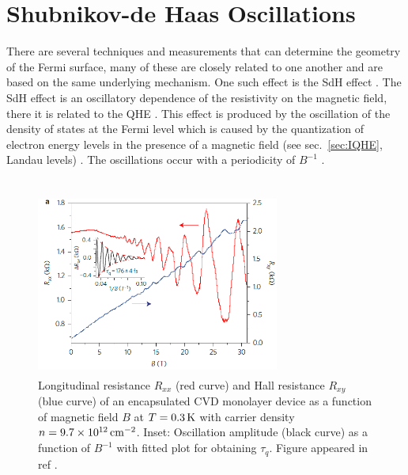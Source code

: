\section{Shubnikov-de Haas Oscillations}\label{sec:qm_oscillations}
There are several techniques and measurements that can determine the geometry of the Fermi surface, many of these are closely related to one another and are based on the same underlying mechanism. One such effect is the \acs{SdH} effect \cite{Shubnikov_Leiden1930}. The \acs{SdH} effect is an oscillatory dependence of the resistivity on the magnetic field, there it is related to the \ac{QHE} \cite{Soule_PhysRev1964}. This effect is produced by the oscillation of the density of states at the Fermi level which is caused by the quantization of electron energy levels in the presence of a magnetic field (see sec.~\ref{sec:IQHE}, Landau levels) \cite{Peierls_ZPhys1933,Landau_RoyalSoc1939}. The oscillations occur with a periodicity of $B^{-1}$ \cite{Shoenberg_Magnet1984}.\\ \\
\begin{figure}[ht]
	\centering
	\includegraphics[height=6cm,width=8cm]{figs/future/mos2_SdH_oscillations}
	\caption[ quantum Hall effect and Shubnikov-de Haas oscillations]{Longitudinal resistance $R_{xx}$ (red curve) and Hall resistance $R_{xy}$ (blue curve) of an encapsulated \hbn \ac{CVD} monolayer  device as a function of magnetic field $B$ at $T=0.3\,\mathrm{K}$ with carrier density $n=9.7\times 10^{12}\,\mathrm{cm}^{-2}$. Inset: Oscillation amplitude (black curve) as a function of $B^{-1}$ with fitted plot for obtaining $\tau_q$. Figure appeared in ref \cite{Cui_NatureNano2015}.}
	\label{fig:mos2_SdH}
\end{figure}
